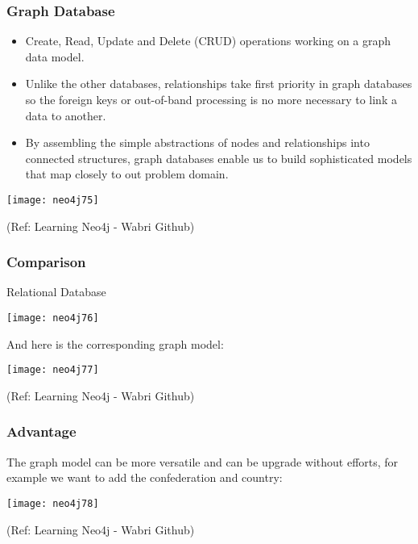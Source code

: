 \begin{frame}\frametitle{Graph Database }


\begin{itemize}
\item Create, Read, Update and Delete (CRUD) operations working on a graph data model. 
\item Unlike the other databases, relationships take first priority in graph databases so the foreign keys or out-of-band processing is no more necessary to link a data to another.
\item By assembling the simple abstractions of nodes and relationships into connected structures, graph databases enable us to build sophisticated models that map closely to out problem domain.
\end{itemize}


\begin{center}
\texttt{[image: neo4j75]}
\end{center}	

{\tiny (Ref: Learning Neo4j - Wabri Github)}
\end{frame}


\begin{frame}\frametitle{Comparison }
Relational Database

\begin{center}
\texttt{[image: neo4j76]}
\end{center}	

And here is the corresponding graph model:


\begin{center}
\texttt{[image: neo4j77]}
\end{center}	

{\tiny (Ref: Learning Neo4j - Wabri Github)}
\end{frame}

\begin{frame}\frametitle{Advantage }

The graph model can be more versatile and can be upgrade without efforts, for example we want to add the confederation and country:

\begin{center}
\texttt{[image: neo4j78]}
\end{center}	

{\tiny (Ref: Learning Neo4j - Wabri Github)}
\end{frame}



